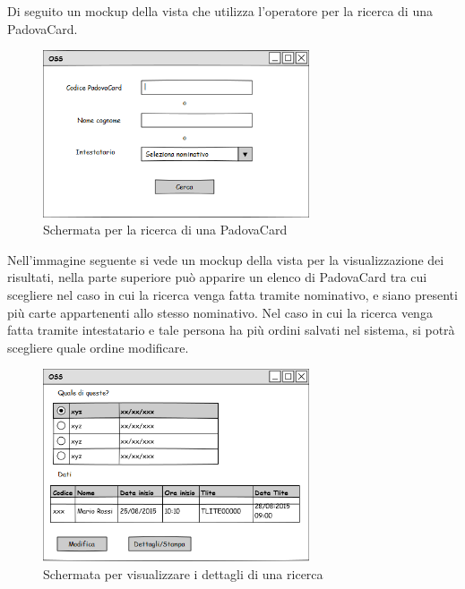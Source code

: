 Di seguito un mockup della vista che utilizza l'operatore per la ricerca di una PadovaCard.
\begin{figure}[H]
\centering
\includegraphics[width=0.7\textwidth]{images/mockup_stampa_tessera.png}
\caption{Schermata per la ricerca di una PadovaCard\label{stampaPadovaCard}}
\end{figure}

Nell'immagine seguente si vede un mockup della vista per la visualizzazione dei risultati, nella parte superiore può apparire un elenco di PadovaCard tra cui scegliere nel caso in cui la ricerca venga fatta tramite nominativo, e siano presenti più carte appartenenti allo stesso nominativo. Nel caso in cui la ricerca venga fatta tramite intestatario e tale persona ha più ordini salvati nel sistema, si potrà scegliere quale ordine modificare.

\begin{figure}[H]
\centering
\includegraphics[width=0.7\textwidth]{images/mockup_dettagli_ricerca.png}
\caption{Schermata per visualizzare i dettagli di una ricerca}
\end{figure}

